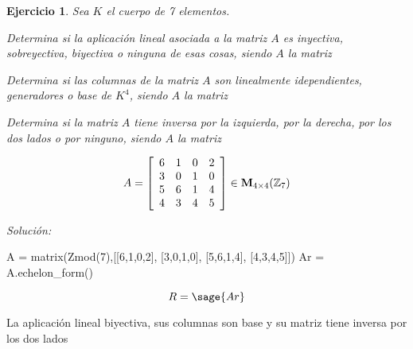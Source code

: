 \documentclass[12pt]{amsart}
\newtheorem{ejer}{Ejercicio}
\begin{document}
\begin{ejer} Sea $K$ el cuerpo de 7 elementos.
\newline
\noindent\begin{minipage}{\textwidth}
\begin{tcolorbox}[colback = green!20!white,title=Versión Aplicaciones]
Determina si la aplicaci\'on lineal asociada a la matriz $A$ es inyectiva, sobreyectiva, biyectiva o ninguna de esas cosas, siendo $A$ la matriz \end{tcolorbox}
\end{minipage} \newline
\noindent\begin{minipage}{\textwidth}
\begin{tcolorbox}[colback = blue!20!white,title=Versión Vectores]
Determina si las columnas de la matriz $A$ son linealmente idependientes, generadores o base de $K^{4}$, siendo $A$ la matriz \end{tcolorbox}
\end{minipage} \newline
\noindent\begin{minipage}{\textwidth} 
\begin{tcolorbox}[colback = red!20!white,title=Versión Inversas]
Determina si la matriz $A$ tiene inversa por la izquierda, por la derecha, por los dos lados o por ninguno, siendo $A$ la matriz 
\end{tcolorbox}
\end{minipage}
\[ A = \left[\begin{array}{rrrr}
6 & 1 & 0 & 2 \\
3 & 0 & 1 & 0 \\
5 & 6 & 1 & 4 \\
4 & 3 & 4 & 5
\end{array}\right] \in {\bf M}_{4\times 4}({\mathbb Z}_{7})\]
\end{ejer}

{\it Soluci\'on:}

\begin{sageblock}
A = matrix(Zmod(7),[[6,1,0,2],
[3,0,1,0],
[5,6,1,4],
[4,3,4,5]])
Ar = A.echelon_form()
\end{sageblock}

$$
	R = \sage{Ar}
$$

La aplicación lineal biyectiva, sus columnas son base y su matriz tiene inversa por los dos lados

\end{document}
